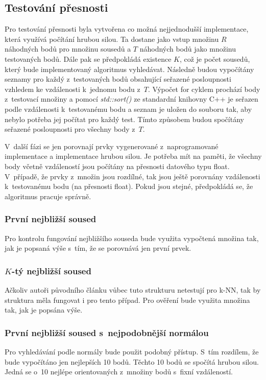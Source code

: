 \subsection*{Testování přesnosti}
Pro testování přesnosti byla vytvořena co možná nejjednodušší implementace, která využívá počítání hrubou silou. Ta dostane jako vstup množinu $R$ náhodných bodů pro množinu sousedů a $T$ náhodných bodů jako množinu testovaných bodů. Dále pak se předpokládá existence $K$, což je počet sousedů, který bude implementovaný algoritmus vyhledávat. Následně budou vypočítány seznamy pro každý z~testovaných bodů obsahující seřazené posloupnosti vzhledem ke vzdálenosti k~jednomu bodu z~$T$. Výpočet for cyklem prochází body z~testovací množiny a pomocí \emph{std::sort()} ze standardní knihovny C++ je seřazen podle vzdálenosti k~testovanému bodu a seznam je uložen do souboru tak, aby nebylo potřeba jej počítat pro každý test. Tímto způsobem budou spočítány seřazené posloupnosti pro všechny body z~$T$.

V~další fázi se jen porovnají prvky vygenerované z~naprogramované implementace a implementace hrubou silou. Je potřeba mít na paměti, že všechny body včetně vzdáleností jsou počítány na přesnosti datového typu float. V~případě, že prvky z~množin jsou rozdílné, tak jsou ještě porovnány vzdálenosti k~testovanému bodu (na přesnosti float). Pokud jsou stejné, předpokládá se, že algoritmus pracuje správně.

\subsubsection*{První nejbližší soused}
Pro kontrolu fungování nejbližšího souseda bude využita vypočtená množina tak, jak je popsaná výše s~tím, že se porovnává jen první prvek.

\subsubsection*{$K$-tý nejbližší soused}
Ačkoliv autoři původního článku vůbec tuto strukturu netestují pro k-NN, tak by struktura měla fungovat i pro tento případ. Pro ověření bude využita množina tak, jak je popsána výše.

\subsubsection*{První nejbližší soused s~nejpodobnější normálou}
Pro vyhledávání podle normály bude použit podobný přístup. S~tím rozdílem, že bude vypočítáno jen nejlepších 10 bodů. Těchto 10 bodů se spočítá hrubou silou. Jedná se o~10 nejlépe orientovaných z~množiny bodů s~fixní vzdáleností. 



